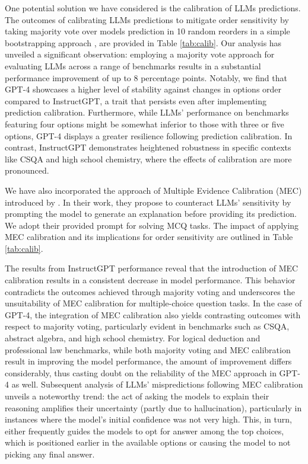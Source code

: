 \documentclass[11pt]{article}
\begin{document}
One potential solution we have considered is the calibration of LLMs predictions. The outcomes of calibrating LLMs predictions to mitigate order sensitivity by taking majority vote over models prediction in 10 random reorders in a simple bootstrapping approach \citep{stickland2020diverse, hou2023large}, are provided in Table \ref{tab:calib}. 
Our analysis has unveiled a significant observation: employing a majority vote approach for evaluating LLMs across a range of benchmarks results in a substantial performance improvement of up to 8 percentage points. 
Notably, we find that GPT-4 showcases a higher level of stability against changes in options order compared to InstructGPT, a trait that persists even after implementing prediction calibration. 
Furthermore, while LLMs' performance on benchmarks featuring four options might be somewhat inferior to those with three or five options, GPT-4 displays a greater resilience following prediction calibration. 
In contrast, InstructGPT demonstrates heightened robustness in specific contexts like CSQA and high school chemistry, where the effects of calibration are more pronounced. 

We have also incorporated the approach of Multiple Evidence Calibration (MEC) introduced by \citet{wang2023large}. 
In their work, they propose to counteract LLMs' sensitivity by prompting the model to generate an explanation before providing its prediction. 
We adopt their provided prompt for solving MCQ tasks. 
The impact of applying MEC calibration and its implications for order sensitivity are outlined in Table \ref{tab:calib}. 

The results from InstructGPT performance reveal that the introduction of MEC calibration results in a consistent decrease in model performance. This behavior contradicts the outcomes achieved through majority voting and underscores the unsuitability of MEC calibration for multiple-choice question tasks.
In the case of GPT-4, the integration of MEC calibration also yields contrasting outcomes with respect to majority voting, particularly evident in benchmarks such as CSQA, abstract algebra, and high school chemistry. For logical deduction and professional law benchmarks, while both majority voting and MEC calibration result in improving the model performance, the amount of improvement differs considerably, thus casting doubt on the reliability of the MEC approach in GPT-4 as well. 
Subsequent analysis of LLMs' mispredictions following MEC calibration unveils a noteworthy trend: the act of asking the models to explain their reasoning amplifies their uncertainty (partly due to hallucination), particularly in instances where the model's initial confidence was not very high. 
This, in turn, either frequently guides the models to opt for answer among the top choices, which is positioned earlier in the available options or causing the model to not picking any final answer.
\end{document}
